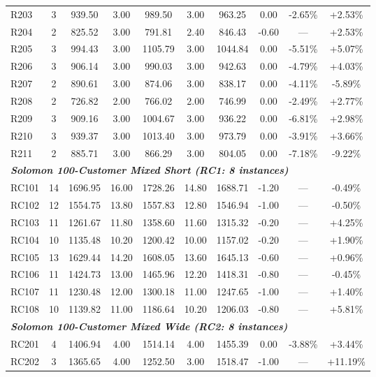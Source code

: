 \documentclass{article}
\begin{document}
\begin{table}[!htbp]
\begin{tabular*}{\textwidth}{@{\extracolsep{\fill}} l cc cc cc ccc @{}}
R203 & 3 & 939.50 & 3.00 & 989.50 & 3.00 & 963.25 & 0.00 & -2.65\% & +2.53\% \\
R204 & 2 & 825.52 & 3.00 & 791.81 & 2.40 & 846.43 & -0.60 & --- & +2.53\% \\
R205 & 3 & 994.43 & 3.00 & 1105.79 & 3.00 & 1044.84 & 0.00 & -5.51\% & +5.07\% \\
R206 & 3 & 906.14 & 3.00 & 990.03 & 3.00 & 942.63 & 0.00 & -4.79\% & +4.03\% \\
R207 & 2 & 890.61 & 3.00 & 874.06 & 3.00 & 838.17 & 0.00 & -4.11\% & -5.89\% \\
R208 & 2 & 726.82 & 2.00 & 766.02 & 2.00 & 746.99 & 0.00 & -2.49\% & +2.77\% \\
R209 & 3 & 909.16 & 3.00 & 1004.67 & 3.00 & 936.22 & 0.00 & -6.81\% & +2.98\% \\
R210 & 3 & 939.37 & 3.00 & 1013.40 & 3.00 & 973.79 & 0.00 & -3.91\% & +3.66\% \\
R211 & 2 & 885.71 & 3.00 & 866.29 & 3.00 & 804.05 & 0.00 & -7.18\% & -9.22\% \\
\midrule
\multicolumn{10}{l}{\textit{\textbf{Solomon 100-Customer Mixed Short (RC1: 8 instances)}}} \\
RC101 & 14 & 1696.95 & 16.00 & 1728.26 & 14.80 & 1688.71 & -1.20 & --- & -0.49\% \\
RC102 & 12 & 1554.75 & 13.80 & 1557.83 & 12.80 & 1546.94 & -1.00 & --- & -0.50\% \\
RC103 & 11 & 1261.67 & 11.80 & 1358.60 & 11.60 & 1315.32 & -0.20 & --- & +4.25\% \\
RC104 & 10 & 1135.48 & 10.20 & 1200.42 & 10.00 & 1157.02 & -0.20 & --- & +1.90\% \\
RC105 & 13 & 1629.44 & 14.20 & 1608.05 & 13.60 & 1645.13 & -0.60 & --- & +0.96\% \\
RC106 & 11 & 1424.73 & 13.00 & 1465.96 & 12.20 & 1418.31 & -0.80 & --- & -0.45\% \\
RC107 & 11 & 1230.48 & 12.00 & 1300.18 & 11.00 & 1247.65 & -1.00 & --- & +1.40\% \\
RC108 & 10 & 1139.82 & 11.00 & 1186.64 & 10.20 & 1206.03 & -0.80 & --- & +5.81\% \\
\midrule
\multicolumn{10}{l}{\textit{\textbf{Solomon 100-Customer Mixed Wide (RC2: 8 instances)}}} \\
RC201 & 4 & 1406.94 & 4.00 & 1514.14 & 4.00 & 1455.39 & 0.00 & -3.88\% & +3.44\% \\
RC202 & 3 & 1365.65 & 4.00 & 1252.50 & 3.00 & 1518.47 & -1.00 & --- & +11.19\% \\

\end{tabular*}
\end{table}
\end{document}
